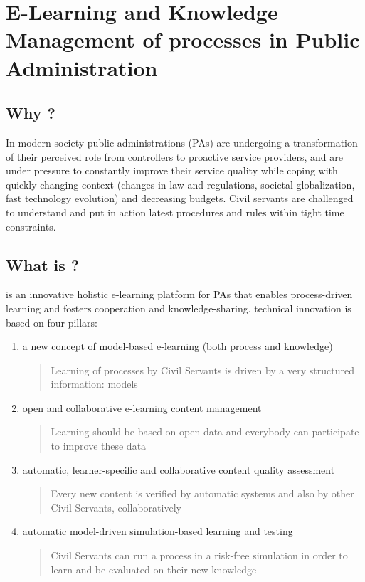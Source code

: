 \documentclass{learnpad}
\begin{document}
\mainmatter


\chapter{E-Learning and Knowledge Management of processes in Public Administration}
\label{ch:intro}

\section{Why \learnpad?}
In modern society public administrations (PAs) are undergoing a transformation
of their perceived role from controllers to proactive service providers, and are
under pressure to constantly improve their service quality while coping with
quickly changing context (changes in law and regulations, societal
globalization, fast technology evolution) and decreasing budgets.  Civil
servants are challenged to understand and put in action latest procedures and
rules within tight time constraints.

\section{What is \learnpad?}
\learnpad is an innovative holistic e-learning platform for PAs that enables
process-driven learning and fosters cooperation and knowledge-sharing.
\learnpad technical innovation is based on four pillars:
\begin{enumerate}
	\item a new concept of model-based e-learning (both process and knowledge)
		\begin{quote}
			Learning of processes by Civil Servants is driven by a very
			structured information: models
		\end{quote}
	\item open and collaborative e-learning content management
		\begin{quote}
			Learning should be based on open data and everybody can participate
			to improve these data
		\end{quote}
	\item automatic, learner-specific and collaborative content quality assessment
		\begin{quote}
			Every new content is verified by automatic systems and also by other
			Civil Servants, collaboratively
		\end{quote}
	\item automatic model-driven simulation-based learning and testing
		\begin{quote}
			Civil Servants can run a process in a risk-free simulation in order
			to learn and be evaluated on their new knowledge
		\end{quote}
\end{enumerate}
\end{document}
